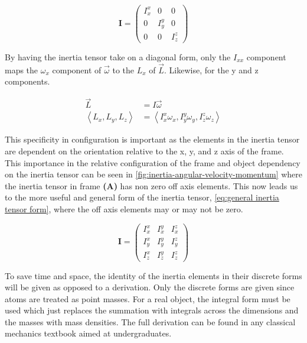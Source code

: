 \documentclass[11pt,a4paper]{book}
\begin{document}
			\begin{equation}
				\label{eq:diagonal Inertia tensor}
				\textbf{I} =
					\begin{pmatrix}
					I_{x}^x & 0 & 0 \\
					0 & I_{y}^y & 0\\
					0 & 0 & I_{z}^z
					\end{pmatrix} 
			\end{equation}	
			
			\noindent
			By having the inertia tensor take on a diagonal form, only the $I_{xx}$ component maps the $\omega_x$ component of $\vec{\omega}$ to the $L_x$ of $\vec{L}$. Likewise, for the y and z components. 
			
			\begin{equation}
				\begin{split}
				\label{eq:diagonal inertia tensor simplification}
				\vec{L}&=I\vec{\omega} \\
				\left\langle L_x, L_y, L_z \right\rangle& = \left\langle I_{x}^x \omega_x, I_{y}^y \omega_y, I_{z}^z \omega_z \right\rangle
				\end{split}
			\end{equation}
			
			This specificity in configuration is important as the elements in the inertia tensor are dependent on the orientation relative to the x, y, and z axis of the frame. This importance in the relative configuration of the frame and object dependency on the inertia tensor can be seen in \autoref{fig:inertia-angular-velocity-momentum} where the inertia tensor in frame \textbf{(A)} has non zero off axis elements. This now leads us to the more useful and general form of the inertia tensor, \autoref{eq:general inertia tensor form}, where the off axis elements may or may not be zero.
			
			\begin{equation}
				\label{eq:general inertia tensor form}
				\textbf{I} = 
					\begin{pmatrix}
						I_{x}^x & I_{x}^y & I_{x}^z \\
						I_{y}^x & I_{y}^y & I_{y}^z \\
						I_{z}^x & I_{z}^y & I_{z}^z
					\end{pmatrix}
			\end{equation}		
			
			To save time and space, the identity of the inertia elements in their discrete forms will be given as opposed to a derivation. Only the discrete forms are given since atoms are treated as point masses. For a real object, the integral form must be used which just replaces the summation with integrals across the dimensions and the masses with mass densities. The full derivation can be found in any classical mechanics textbook aimed at undergraduates.
			
\end{document}
